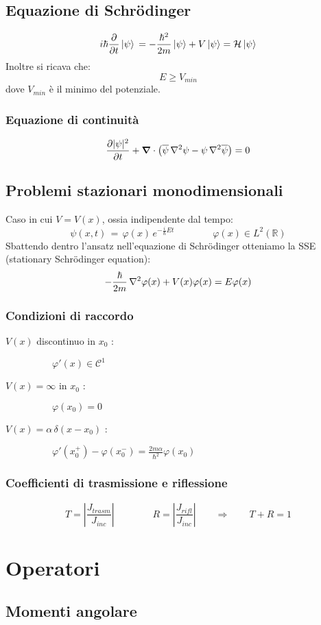 \subsection{Equazione di Schr\"{o}dinger}
$$ 
  i\hbar \frac{ \partial }{ \partial t}\left| \psi \right> \, = -\frac{\hbar^2}{2m}\left| \psi \right> + V \left| \psi \right>  = \mathcal{H} \left| \psi \right>
$$
Inoltre si ricava che:
$$
E \geq V_{min}
$$
dove $V_{min}$ è il minimo del potenziale.
\subsubsection{Equazione di continuità}
$$
\frac{\partial | \psi|^2}{\partial t} + \mbox{\boldmath$ \nabla $} \cdot \left( \overline{\psi} \, \nabla^2\psi - \psi \, \nabla^2\overline{\psi} \right) = 0
$$
\subsection{Problemi stazionari monodimensionali}
Caso in cui $ V= V(x)$, ossia indipendente dal tempo:
$$	\psi(x,t) \, = \, \varphi(x) \, e^{ -\frac{i}{\hbar} E t } \qquad \qquad \varphi(x) \in L^2(\mathbb{R}) 
$$	 
Sbattendo dentro l'ansatz nell'equazione di Schr\"{o}dinger otteniamo la SSE (stationary Schr\"{o}dinger equation):
$$
-\frac{\hbar}{2m} \, \nabla^2 \varphi(x) + V(x) \varphi(x) = E \varphi(x)
$$ 
\subsubsection{Condizioni di raccordo}
\begin{description}
 \item[$V(x)$ discontinuo in $x_0$ : ] $\qquad \varphi ' (x) \in \mathcal{C}^1 $
  \item[$V(x) = \infty$ in $x_0$ : ] $	\qquad \varphi(x_0) = 0 $
 \item[$V(x) = \alpha \, \delta (x-x_0)$ : ] $\qquad \varphi'(x_{0}^{+}) - \varphi(x_{0}^{-}) = \frac{2 m \alpha}{\hbar^2} \varphi(x_0)$
\end{description}
\subsubsection{Coefficienti di trasmissione e riflessione}
$$
T = \left| \frac{J_{trasm}}{J_{inc}}\right|  \qquad \qquad R = \left| \frac{J_{rifl}}{J_{inc}} \right| \qquad \Longrightarrow \qquad T + R = 1 
$$ 


\section{Operatori}
\subsection{Momenti angolare}

